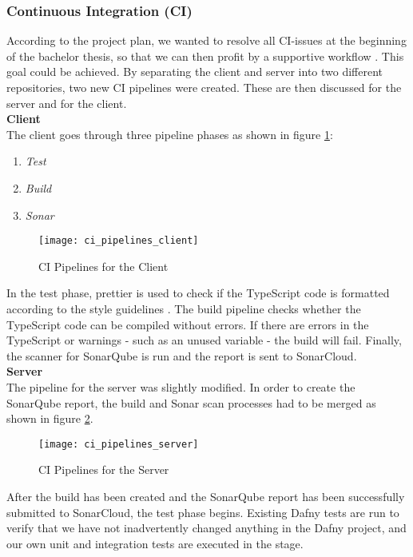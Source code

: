\subsubsection{Continuous Integration (CI)}
According to the project plan,
we wanted to resolve all CI-issues at the beginning of the bachelor thesis,
so that we can then profit by a supportive workflow \cite{projectplan}. 
This goal could be achieved.
By separating the client and server into two different repositories, two new CI pipelines were created.
These are then discussed for the server and for the client. \\

{\bf Client}\\
The client goes through three pipeline phases as shown in figure \ref{fig:ci_client}:
\begin{enumerate}
    \item \textit{Test}
    \item \textit{Build}
    \item \textit{Sonar}
\end{enumerate}

\begin{figure}[H]
    \centering
    \texttt{[image: ci\_pipelines\_client]}
    \caption{CI Pipelines for the Client}
    \label{fig:ci_client}
\end{figure}

In the test phase, prettier \cite{dev} is used to check if the TypeScript code
is formatted according to the style guidelines \cite{projectplan}.
The build pipeline checks whether the TypeScript code can be compiled without errors.
If there are errors in the TypeScript or warnings - such as an unused variable - the build will fail.
Finally, the scanner for SonarQube is run and the report is sent to SonarCloud. \\

{\bf Server}\\
The pipeline for the server was slightly modified.
In order to create the SonarQube report, the build and Sonar scan processes had to be merged
as shown in figure \ref{fig:ci_server}.

\begin{figure}[H]
    \centering
    \texttt{[image: ci\_pipelines\_server]}
    \caption{CI Pipelines for the Server}
    \label{fig:ci_server}
\end{figure}

After the build has been created and the SonarQube report has been successfully submitted to SonarCloud,
the test phase begins.
Existing Dafny tests are run to verify
that we have not inadvertently changed anything in the Dafny project,
and our own unit and integration tests are executed in the  stage. \\

